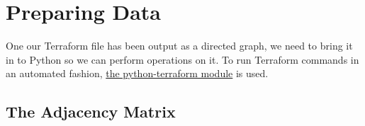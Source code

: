 \section{\label{sec:preparation}Preparing Data}

\justifying
One our Terraform file has been output as a directed graph, we need to bring it in to Python so we can
perform operations on it. To run Terraform commands in an automated fashion, \href{https://pypi.org/project/python-terraform/}{the python-terraform module}
is used.

\subsection{\label{sec:adjacency}The Adjacency Matrix}



\clearpage
\begin{versionhistory}
\end{versionhistory}
\nocite{*}




